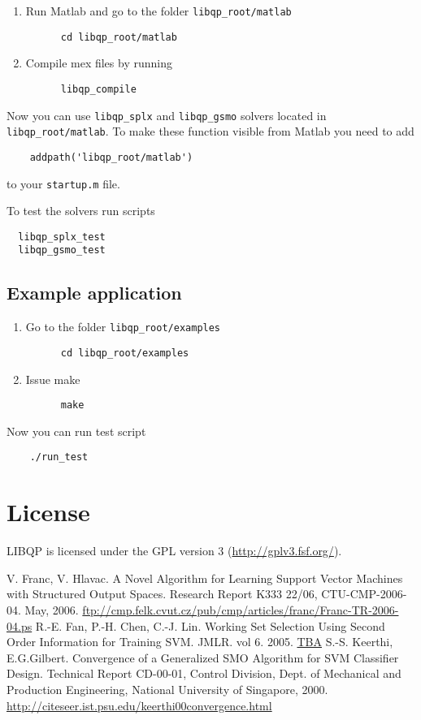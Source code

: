 \documentclass{amsart}
\begin{document}
\begin{enumerate}
  \item Run Matlab and go to the folder \verb|libqp_root/matlab|
    \begin{verbatim}
      cd libqp_root/matlab
    \end{verbatim}
  \item Compile mex files by running
    \begin{verbatim}
      libqp_compile
    \end{verbatim}
\end{enumerate}
Now you can use \verb|libqp_splx| and \verb|libqp_gsmo| solvers located in
\verb|libqp_root/matlab|. To make these function visible from Matlab you 
need to add 
\begin{verbatim}
    addpath('libqp_root/matlab')
\end{verbatim}
to your \verb|startup.m| file. 

\noindent
To test the solvers run scripts
\begin{verbatim}
  libqp_splx_test
  libqp_gsmo_test
\end{verbatim}


\subsection*{Example application}

\begin{enumerate}
  \item Go to the folder \verb|libqp_root/examples|
    \begin{verbatim}      
      cd libqp_root/examples
    \end{verbatim}
  \item Issue make 
    \begin{verbatim}      
      make
    \end{verbatim}
\end{enumerate}
Now you can run test script
\begin{verbatim}      
    ./run_test
\end{verbatim}


\section*{License}

LIBQP is licensed under the GPL version 3 (\url{http://gplv3.fsf.org/}).


\begin{thebibliography}{00}
V. Franc, V. Hlavac. A Novel Algorithm for Learning Support Vector Machines
with Structured Output Spaces. Research Report K333 22/06, CTU-CMP-2006-04. 
May, 2006. 
\url{ftp://cmp.felk.cvut.cz/pub/cmp/articles/franc/Franc-TR-2006-04.ps}
R.-E. Fan, P.-H. Chen, C.-J. Lin. Working Set Selection Using Second Order 
Information for Training SVM. JMLR. vol 6. 2005.
\url{TBA}
S.-S. Keerthi, E.G.Gilbert. Convergence of a Generalized SMO Algorithm for SVM 
Classifier Design. Technical Report CD-00-01, Control Division, Dept. of Mechanical 
and Production Engineering, National University of Singapore, 2000. 
\url{http://citeseer.ist.psu.edu/keerthi00convergence.html}
\end{thebibliography}
\end{document}
